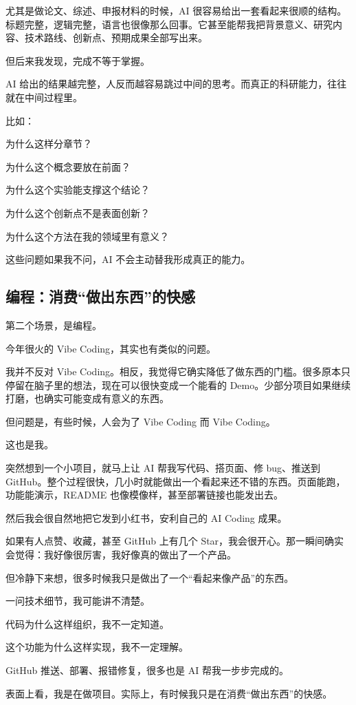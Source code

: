 \documentclass[UTF8,zihao=-4,a4paper]{ctexart}
\begin{document}
尤其是做论文、综述、申报材料的时候，AI 很容易给出一套看起来很顺的结构。标题完整，逻辑完整，语言也很像那么回事。它甚至能帮我把背景意义、研究内容、技术路线、创新点、预期成果全部写出来。

但后来我发现，完成不等于掌握。

AI 给出的结果越完整，人反而越容易跳过中间的思考。而真正的科研能力，往往就在中间过程里。

比如：

为什么这样分章节？\par
为什么这个概念要放在前面？\par
为什么这个实验能支撑这个结论？\par
为什么这个创新点不是表面创新？\par
为什么这个方法在我的领域里有意义？

这些问题如果我不问，AI 不会主动替我形成真正的能力。

\subsection{编程：消费“做出东西”的快感}
第二个场景，是编程。

今年很火的 Vibe Coding，其实也有类似的问题。

我并不反对 Vibe Coding。相反，我觉得它确实降低了做东西的门槛。很多原本只停留在脑子里的想法，现在可以很快变成一个能看的 Demo。少部分项目如果继续打磨，也确实可能变成有意义的东西。

但问题是，有些时候，人会为了 Vibe Coding 而 Vibe Coding。

这也是我。

突然想到一个小项目，就马上让 AI 帮我写代码、搭页面、修 bug、推送到 GitHub。整个过程很快，几小时就能做出一个看起来还不错的东西。页面能跑，功能能演示，README 也像模像样，甚至部署链接也能发出去。

然后我会很自然地把它发到小红书，安利自己的 AI Coding 成果。

如果有人点赞、收藏，甚至 GitHub 上有几个 Star，我会很开心。那一瞬间确实会觉得：我好像很厉害，我好像真的做出了一个产品。

但冷静下来想，很多时候我只是做出了一个“看起来像产品”的东西。

一问技术细节，我可能讲不清楚。\par
代码为什么这样组织，我不一定知道。\par
这个功能为什么这样实现，我不一定理解。\par
GitHub 推送、部署、报错修复，很多也是 AI 帮我一步步完成的。

表面上看，我是在做项目。实际上，有时候我只是在消费“做出东西”的快感。
\end{document}
